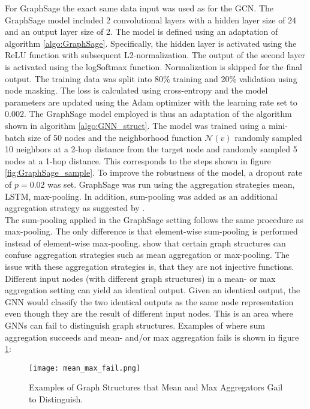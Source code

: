   For GraphSage the exact same data input was used as for the GCN. The 
  GraphSage model included 2 convolutional layers with a hidden layer size of
  24 and an output layer size of 2. The model is defined using an adaptation of 
  algorithm \ref{algo:GraphSage}. Specifically, the hidden layer is activated 
  using the ReLU function with subsequent L2-normalization. The output of the 
  second layer is activated using the logSoftmax function. Normalization is 
  skipped for the final output. The training data was split into 80\% training 
  and 20\% validation using node masking. The loss is calculated using 
  cross-entropy and the model parameters are updated using the Adam optimizer 
  with the learning rate set to 0.002. The GraphSage model employed is thus an
  adaptation of the algorithm shown in algorithm \ref{algo:GNN_struct}. The 
  model was trained using a mini-batch size of 50 nodes and the neighborhood 
  function $\mathcal{N}(v)$ randomly sampled 10 neighbors at a 2-hop distance
  from the target node and randomly sampled 5 nodes at a 1-hop distance. This 
  corresponds to the steps shown in figure \ref{fig:GraphSage_sample}. To 
  improve the robustness of the model, a dropout rate of $p = 0.02$ was set. 
  GraphSage was run using the aggregation strategies mean, LSTM, max-pooling. 
  In addition, sum-pooling was added as an additional aggregation strategy 
  as suggested by \cite{xu2019powerful}. \\

  \noindent The sum-pooling applied in the GraphSage setting follows 
  the same procedure as max-pooling. The only difference is that element-wise 
  sum-pooling is performed instead of element-wise max-pooling. 
  \cite{xu2019powerful} show that certain graph structures can confuse 
  aggregation strategies such as mean aggregation or max-pooling. The issue with 
  these aggregation strategies is, that they are not injective functions. 
  Different input nodes (with different graph structures) in a mean- or 
  max aggregation setting can yield an identical output. Given an 
  identical output, the GNN would classify the two identical outputs as the 
  same node representation even though they are the result of different input 
  nodes. This is an area where GNNs can fail to distinguish graph structures. 
  Examples of where sum aggregation succeeds and mean- and/or max aggregation 
  fails is shown in figure \ref{fig:graph_structures}:

  \begin{figure}[h]
		\centering
		\texttt{[image: mean\_max\_fail.png]}
		\caption{Examples of Graph Structures that Mean and Max Aggregators 
        Gail to Distinguish.}
        \label{fig:graph_structures}
        \cite[p. 6]{xu2019powerful}
  \end{figure}

